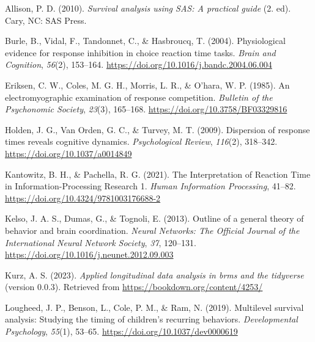 \documentclass[
  english,
  man,floatsintext]{apa6}
\newlength{\cslhangindent}
\newenvironment{CSLReferences}[2] %
 {\begin{list}{}{%
  \setlength{\itemindent}{0pt}
  \setlength{\leftmargin}{0pt}
  \setlength{\parsep}{0pt}
  \ifodd #1
   \setlength{\leftmargin}{\cslhangindent}
   \setlength{\itemindent}{-1\cslhangindent}
  \fi
  \setlength{\itemsep}{#2\baselineskip}}}
 {\end{list}}
\begin{document}
\label{refs}
\begin{CSLReferences}{1}{0}
Allison, P. D. (2010). \emph{Survival analysis using {SAS}: A practical guide} (2. ed). Cary, NC: SAS Press.

Burle, B., Vidal, F., Tandonnet, C., \& Hasbroucq, T. (2004). Physiological evidence for response inhibition in choice reaction time tasks. \emph{Brain and Cognition}, \emph{56}(2), 153--164. \url{https://doi.org/10.1016/j.bandc.2004.06.004}

Eriksen, C. W., Coles, M. G. H., Morris, L. R., \& O'hara, W. P. (1985). An electromyographic examination of response competition. \emph{Bulletin of the Psychonomic Society}, \emph{23}(3), 165--168. \url{https://doi.org/10.3758/BF03329816}

Holden, J. G., Van Orden, G. C., \& Turvey, M. T. (2009). Dispersion of response times reveals cognitive dynamics. \emph{Psychological Review}, \emph{116}(2), 318--342. \url{https://doi.org/10.1037/a0014849}

Kantowitz, B. H., \& Pachella, R. G. (2021). The {Interpretation} of {Reaction Time} in {Information-Processing Research} 1. \emph{Human Information Processing}, 41--82. \url{https://doi.org/10.4324/9781003176688-2}

Kelso, J. A. S., Dumas, G., \& Tognoli, E. (2013). Outline of a general theory of behavior and brain coordination. \emph{Neural Networks: The Official Journal of the International Neural Network Society}, \emph{37}, 120--131. \url{https://doi.org/10.1016/j.neunet.2012.09.003}

Kurz, A. S. (2023). \emph{Applied longitudinal data analysis in brms and the tidyverse} (version 0.0.3). Retrieved from \url{https://bookdown.org/content/4253/}

Lougheed, J. P., Benson, L., Cole, P. M., \& Ram, N. (2019). Multilevel survival analysis: {Studying} the timing of children's recurring behaviors. \emph{Developmental Psychology}, \emph{55}(1), 53--65. \url{https://doi.org/10.1037/dev0000619}


\end{CSLReferences}
\end{document}
